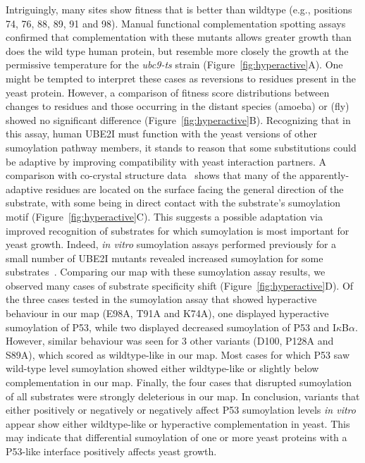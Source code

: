 Intriguingly, many sites show fitness that is better than wildtype (e.g., positions 74, 76, 88, 89, 91 and 98). Manual functional complementation spotting assays confirmed that complementation with these mutants allows greater growth than does the wild type human protein, but resemble more closely the growth at the permissive temperature for the \textit{ubc9-ts} strain (Figure~\ref{fig:hyperactive}A). One might be tempted to interpret these cases as reversions to residues present in the yeast protein. However, a comparison of fitness score distributions between changes to   residues and those occurring in the distant species  (amoeba) or  (fly) showed no significant difference (Figure~\ref{fig:hyperactive}B). Recognizing that in this assay, human UBE2I must function with the yeast versions of other sumoylation pathway members, it stands to reason that some substitutions could be adaptive by improving compatibility with yeast interaction partners. A comparison with co-crystal structure data~\cite{gareau_determinants_2012} shows that many of the apparently-adaptive residues are located on the surface facing the general direction of the substrate, with some being in direct contact with the substrate's sumoylation motif (Figure~\ref{fig:hyperactive}C). This suggests a possible adaptation via improved recognition of substrates for which sumoylation is most important for yeast growth. Indeed, \textit{in vitro} sumoylation assays performed previously for a small number of UBE2I mutants revealed increased sumoylation for some substrates~\cite{bernier-villamor_structural_2002}. Comparing our map with these sumoylation assay results, we observed many cases of substrate specificity shift (Figure~\ref{fig:hyperactive}D). Of the three cases tested in the sumoylation assay that showed hyperactive behaviour in our map (E98A, T91A and K74A), one displayed hyperactive sumoylation of P53, while two displayed decreased sumoylation of P53 and I$\kappa$B$\alpha$. However, similar behaviour was seen for 3 other variants (D100, P128A and S89A), which scored as wildtype-like in our map. Most cases for which P53 saw wild-type level sumoylation showed either wildtype-like or slightly below complementation in our map. Finally, the four cases that disrupted sumoylation of all substrates were strongly deleterious in our map. In conclusion, variants that either positively or negatively or negatively affect P53 sumoylation levels \textit{in vitro} appear show either wildtype-like or hyperactive complementation in yeast. This may indicate that differential sumoylation of one or more yeast proteins with a P53-like interface positively affects yeast growth.


